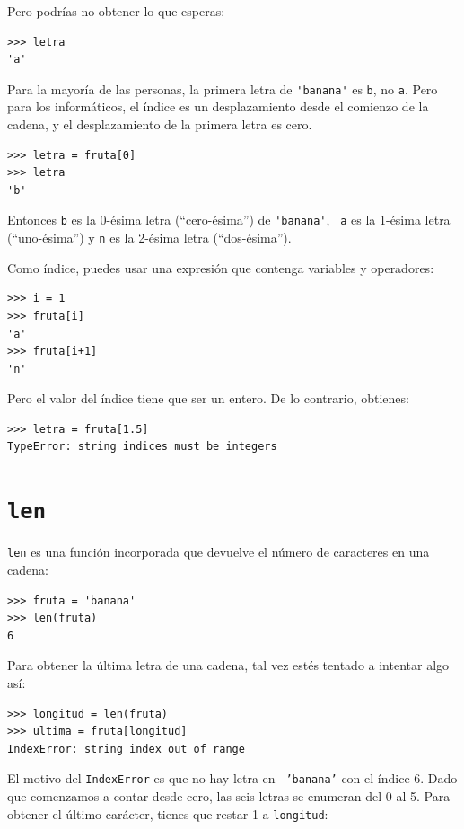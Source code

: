 \documentclass[10pt]{book}
\begin{document}
Pero podrías no obtener lo que esperas:

\begin{verbatim}
>>> letra
'a'
\end{verbatim}
%
Para la mayoría de las personas, la primera letra de \verb"'banana'" es {\tt b}, no
{\tt a}.  Pero para los informáticos, el índice es un desplazamiento desde el
comienzo de la cadena, y el desplazamiento de la primera letra es cero.

\begin{verbatim}
>>> letra = fruta[0]
>>> letra
'b'
\end{verbatim}
%
Entonces {\tt b} es la 0-ésima letra  (``cero-ésima'') de \verb"'banana'", {\tt
  a} es la 1-ésima letra (``uno-ésima'') y {\tt n} es la 2-ésima letra
(``dos-ésima'').   

Como índice, puedes usar una expresión que contenga variables y
operadores:

\begin{verbatim}
>>> i = 1
>>> fruta[i]
'a'
>>> fruta[i+1]
'n'
\end{verbatim}
%

Pero el valor del índice tiene que ser un entero.  De lo contrario,
obtienes:

\begin{verbatim}
>>> letra = fruta[1.5]
TypeError: string indices must be integers
\end{verbatim}
%

\section{{\tt len}}

{\tt len} es una función incorporada que devuelve el número de caracteres
en una cadena:

\begin{verbatim}
>>> fruta = 'banana'
>>> len(fruta)
6
\end{verbatim}
%
Para obtener la última letra de una cadena, tal vez estés tentado a intentar algo
así:

\begin{verbatim}
>>> longitud = len(fruta)
>>> ultima = fruta[longitud]
IndexError: string index out of range
\end{verbatim}
%
El motivo del {\tt IndexError} es que no hay letra en {\tt
'banana'} con el índice 6.  Dado que comenzamos a contar desde cero, las
seis letras se enumeran del 0 al 5.  Para obtener el último carácter, tienes
que restar 1 a {\tt longitud}:
\end{document}

